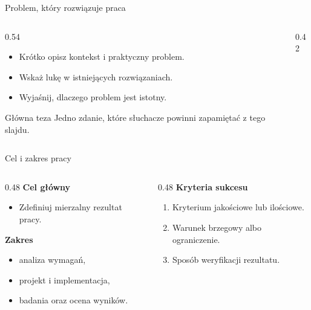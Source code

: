 \begin{frame}{Problem, który rozwiązuje praca}
  \begin{columns}[T,onlytextwidth]
    \begin{column}{0.54\textwidth}
      \begin{itemize}
        \item Krótko opisz kontekst i praktyczny problem.
        \item Wskaż lukę w istniejących rozwiązaniach.
        \item Wyjaśnij, dlaczego problem jest istotny.
      \end{itemize}
      \vspace{3mm}
      \begin{block}{Główna teza}
        Jedno zdanie, które słuchacze powinni zapamiętać z tego slajdu.
      \end{block}
    \end{column}
    \begin{column}{0.42\textwidth}
    \end{column}
  \end{columns}
\end{frame}

\begin{frame}{Cel i zakres pracy}
  \begin{columns}[T,onlytextwidth]
    \begin{column}{0.48\textwidth}
      \textbf{Cel główny}
      \begin{itemize}
        \item Zdefiniuj mierzalny rezultat pracy.
      \end{itemize}
      \vspace{3mm}
      \textbf{Zakres}
      \begin{itemize}
        \item analiza wymagań,
        \item projekt i implementacja,
        \item badania oraz ocena wyników.
      \end{itemize}
    \end{column}
    \begin{column}{0.48\textwidth}
      \textbf{Kryteria sukcesu}
      \begin{enumerate}
        \item Kryterium jakościowe lub ilościowe.
        \item Warunek brzegowy albo ograniczenie.
        \item Sposób weryfikacji rezultatu.
      \end{enumerate}
    \end{column}
  \end{columns}
\end{frame}
